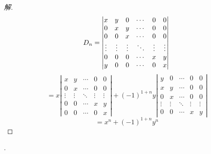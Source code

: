 \documentclass[10pt,a4paper]{report}
\begin{document}
\begin{proof}[解]
	$$
	D_{n} = \left|
	\begin{matrix}
	x & y & 0 & \cdots & 0 & 0\\
	0 & x & y & \cdots & 0 & 0\\
	0 & 0 & x & \cdots & 0 & 0\\
	\vdots & \vdots & \vdots & \ddots & \vdots & \vdots\\
	0 & 0 & 0 & \cdots & x & y \\
	y & 0 & 0 & \cdots & 0 & x 
	\end{matrix}
	\right|\\
	$$
	$$
	= x\left|
	\begin{matrix}
	x & y & \cdots & 0 & 0\\
	0 & x & \cdots & 0 & 0\\
	\vdots & \vdots & \ddots & \vdots & \vdots\\
	0 & 0 & \cdots & x & y \\
	0 & 0 & \cdots & 0 & x 
	\end{matrix}
	\right|
	+(-1)^{1+n}y\left|
	\begin{matrix}
	y & 0 & \cdots & 0 & 0\\
	x & y & \cdots & 0 & 0\\
	0 & x & \cdots & 0 & 0\\
	\vdots & \vdots & \ddots & \vdots & \vdots\\
	0 & 0 & \cdots & x & y  
	\end{matrix}
	\right|
	$$
	$$
	=x^{n}+(-1)^{1+n}y^{n}
	$$
\end{proof}
.
\end{document}
